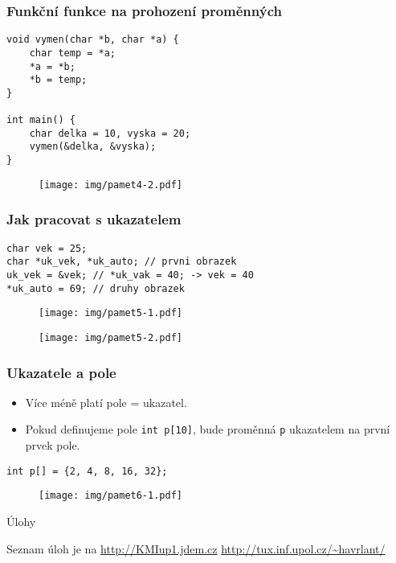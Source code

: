 \documentclass{beamer}
\newenvironment{itemizex}%
  {\large \begin{itemize}%
    \setlength{\itemsep}{8pt}%
    \setlength{\parskip}{8pt}}%
  {\end{itemize}}
\begin{document}
\begin{frame}[t,fragile]\frametitle{Funkční funkce na prohození proměnných} 
\begin{verbatim} 
void vymen(char *b, char *a) {
    char temp = *a;
    *a = *b;
    *b = temp;
}

int main() {
    char delka = 10, vyska = 20;
    vymen(&delka, &vyska);
}
\end{verbatim}

\begin{figure}[htb]
    \centering
    \texttt{[image: img/pamet4-2.pdf]}
\end{figure}
\end{frame}


\begin{frame}[t,fragile]\frametitle{Jak pracovat s ukazatelem} 
\begin{verbatim} 
char vek = 25;    
char *uk_vek, *uk_auto; // prvni obrazek
uk_vek = &vek; // *uk_vak = 40; -> vek = 40
*uk_auto = 69; // druhy obrazek
\end{verbatim}

\begin{figure}[htb]
    \centering
    \texttt{[image: img/pamet5-1.pdf]}
\end{figure}

\begin{figure}[htb]
    \centering
    \texttt{[image: img/pamet5-2.pdf]}
\end{figure}
\end{frame}


\begin{frame}[t,fragile]\frametitle{Ukazatele a pole} 
    \begin{itemizex}
        \item Více méně platí pole = ukazatel.
        \item Pokud definujeme pole \texttt{int p[10]}, bude proměnná \texttt{p} ukazatelem na první prvek pole.
    \end{itemizex}

\begin{verbatim} 
int p[] = {2, 4, 8, 16, 32};
\end{verbatim}
\begin{figure}[htb]
    \centering
    \texttt{[image: img/pamet6-1.pdf]}
\end{figure}
\end{frame}


\begin{frame}[t,fragile]{Úlohy}
\begin{center}
\vskip 1cm
{\Large Seznam úloh je na \url{http://KMIup1.jdem.cz}}
\vskip 2cm
\url{http://tux.inf.upol.cz/~havrlant/}
\end{center}
\end{frame}
\end{document}
